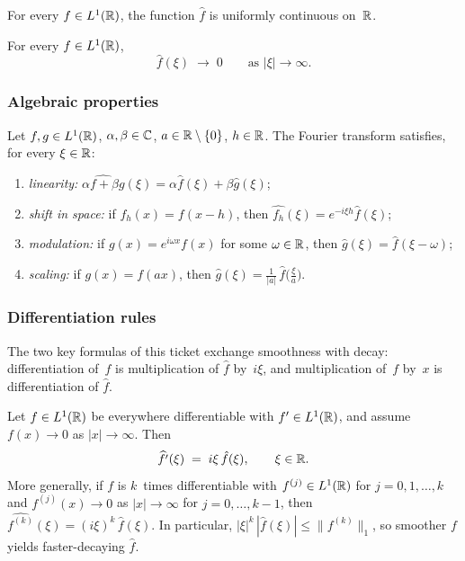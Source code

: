 \begin{theorem}
\label{thm:ft-continuous}
For every $f \in L^1(\mathbb{R})$, the function $\hat f$ is uniformly
continuous on~$\mathbb{R}$.
\end{theorem}

\begin{theorem}
\label{thm:rl-line}
For every $f \in L^1(\mathbb{R})$,
\[
  \hat f(\xi) \;\to\; 0 \qquad \text{as } |\xi| \to \infty.
\]
\end{theorem}

\subsubsection*{Algebraic properties}

\begin{proposition}
\label{prop:ft-algebra}
Let $f, g \in L^1(\mathbb{R})$, $\alpha, \beta \in \mathbb{C}$, $a \in \mathbb{R} \setminus \{0\}$,
$h \in \mathbb{R}$. The Fourier transform satisfies, for every $\xi \in \mathbb{R}$:
\begin{enumerate}[label=(\alph*)]
  \item \emph{linearity:} $\widehat{\alpha f + \beta g}(\xi) = \alpha \hat f(\xi) + \beta \hat g(\xi)$;
  \item \emph{shift in space:} if $f_h(x) = f(x - h)$, then $\widehat{f_h}(\xi) = e^{-i \xi h} \hat f(\xi)$;
  \item \emph{modulation:} if $g(x) = e^{i \omega x} f(x)$ for some $\omega \in \mathbb{R}$, then $\hat g(\xi) = \hat f(\xi - \omega)$;
  \item \emph{scaling:} if $g(x) = f(a x)$, then $\hat g(\xi) = \tfrac{1}{|a|}\, \hat f\!\bigl(\tfrac{\xi}{a}\bigr)$.
\end{enumerate}
\end{proposition}

\subsubsection*{Differentiation rules}

The two key formulas of this ticket exchange smoothness with decay:
differentiation of~$f$ is multiplication of $\hat f$ by~$i\xi$, and
multiplication of~$f$ by~$x$ is differentiation of $\hat f$.

\begin{theorem}
\label{thm:ft-of-derivative}
Let $f \in L^1(\mathbb{R})$ be everywhere differentiable with
$f' \in L^1(\mathbb{R})$, and assume $f(x) \to 0$ as $|x| \to \infty$. Then
\[
  \widehat{f'}(\xi) \;=\; i \xi \, \hat f(\xi), \qquad \xi \in \mathbb{R}.
\]
More generally, if $f$ is $k$~times differentiable with
$f^{(j)} \in L^1(\mathbb{R})$ for $j = 0, 1, \dots, k$ and
$f^{(j)}(x) \to 0$ as $|x| \to \infty$ for $j = 0, \dots, k - 1$, then
$\widehat{f^{(k)}}(\xi) = (i\xi)^k \, \hat f(\xi)$. In particular,
$|\xi|^k\, |\hat f(\xi)| \leq \|f^{(k)}\|_1$, so smoother $f$ yields
faster-decaying $\hat f$.
\end{theorem}

